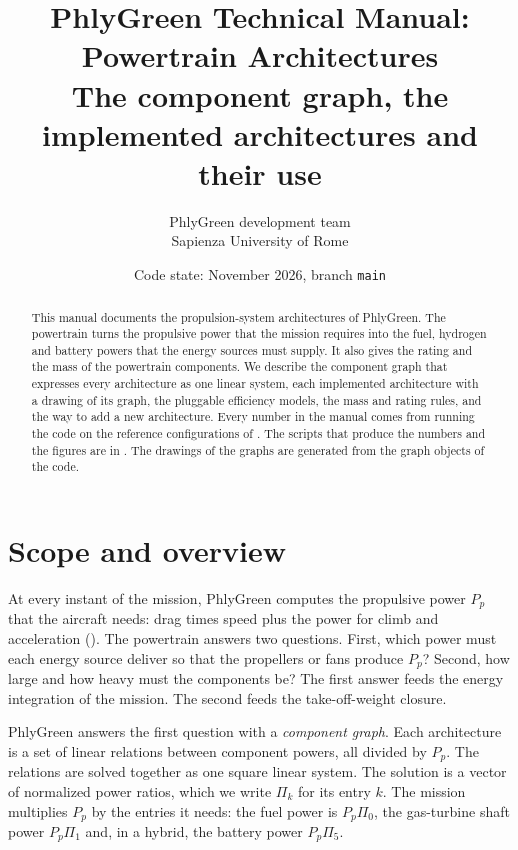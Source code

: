 \documentclass[a4paper,11pt]{article}
\title{PhlyGreen Technical Manual: Powertrain Architectures\\[4pt]
\large The component graph, the implemented architectures and their use}
\author{PhlyGreen development team\\Sapienza University of Rome}
\date{Code state: November 2026, branch \texttt{main}}
\begin{document}
\maketitle

\begin{abstract}
\noindent This manual documents the propulsion-system architectures of PhlyGreen. The
powertrain turns the propulsive power that the mission requires into the fuel, hydrogen and
battery powers that the energy sources must supply. It also gives the rating and the mass of
the powertrain components. We describe the component graph that expresses every architecture
as one linear system, each implemented architecture with a drawing of its graph, the
pluggable efficiency models, the mass and rating rules, and the way to add a new
architecture. Every number in the manual comes from running the code on the reference
configurations of . The scripts that produce the numbers and
the figures are in . The drawings of the graphs are
generated from the graph objects of the code.
\end{abstract}

\tableofcontents
\newpage

\section{Scope and overview}\label{sec:scope}

At every instant of the mission, PhlyGreen computes the propulsive power $P_p$ that the
aircraft needs: drag times speed plus the power for climb and acceleration
(). The powertrain answers two questions. First, which power must
each energy source deliver so that the propellers or fans produce $P_p$? Second, how large
and how heavy must the components be? The first answer feeds the energy integration of the
mission. The second feeds the take-off-weight closure.

PhlyGreen answers the first question with a \emph{component graph}. Each architecture is a
set of linear relations between component powers, all divided by $P_p$. The relations are
solved together as one square linear system. The solution is a vector of normalized power
ratios, which we write $\Pi_k$ for its entry $k$. The mission multiplies $P_p$ by the entries
it needs: the fuel power is $P_p\Pi_0$, the gas-turbine shaft power $P_p\Pi_1$ and, in a
hybrid, the battery power $P_p\Pi_5$.
\end{document}

